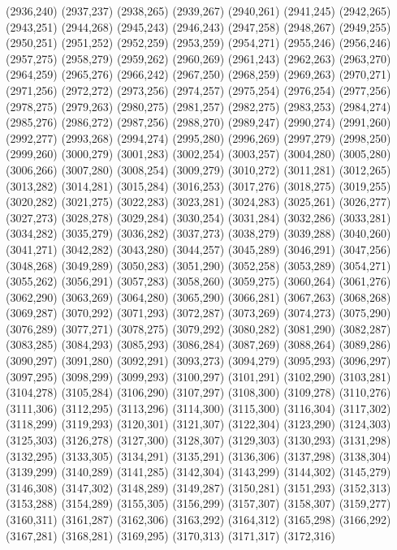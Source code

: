 (2936,240)
(2937,237)
(2938,265)
(2939,267)
(2940,261)
(2941,245)
(2942,265)
(2943,251)
(2944,268)
(2945,243)
(2946,243)
(2947,258)
(2948,267)
(2949,255)
(2950,251)
(2951,252)
(2952,259)
(2953,259)
(2954,271)
(2955,246)
(2956,246)
(2957,275)
(2958,279)
(2959,262)
(2960,269)
(2961,243)
(2962,263)
(2963,270)
(2964,259)
(2965,276)
(2966,242)
(2967,250)
(2968,259)
(2969,263)
(2970,271)
(2971,256)
(2972,272)
(2973,256)
(2974,257)
(2975,254)
(2976,254)
(2977,256)
(2978,275)
(2979,263)
(2980,275)
(2981,257)
(2982,275)
(2983,253)
(2984,274)
(2985,276)
(2986,272)
(2987,256)
(2988,270)
(2989,247)
(2990,274)
(2991,260)
(2992,277)
(2993,268)
(2994,274)
(2995,280)
(2996,269)
(2997,279)
(2998,250)
(2999,260)
(3000,279)
(3001,283)
(3002,254)
(3003,257)
(3004,280)
(3005,280)
(3006,266)
(3007,280)
(3008,254)
(3009,279)
(3010,272)
(3011,281)
(3012,265)
(3013,282)
(3014,281)
(3015,284)
(3016,253)
(3017,276)
(3018,275)
(3019,255)
(3020,282)
(3021,275)
(3022,283)
(3023,281)
(3024,283)
(3025,261)
(3026,277)
(3027,273)
(3028,278)
(3029,284)
(3030,254)
(3031,284)
(3032,286)
(3033,281)
(3034,282)
(3035,279)
(3036,282)
(3037,273)
(3038,279)
(3039,288)
(3040,260)
(3041,271)
(3042,282)
(3043,280)
(3044,257)
(3045,289)
(3046,291)
(3047,256)
(3048,268)
(3049,289)
(3050,283)
(3051,290)
(3052,258)
(3053,289)
(3054,271)
(3055,262)
(3056,291)
(3057,283)
(3058,260)
(3059,275)
(3060,264)
(3061,276)
(3062,290)
(3063,269)
(3064,280)
(3065,290)
(3066,281)
(3067,263)
(3068,268)
(3069,287)
(3070,292)
(3071,293)
(3072,287)
(3073,269)
(3074,273)
(3075,290)
(3076,289)
(3077,271)
(3078,275)
(3079,292)
(3080,282)
(3081,290)
(3082,287)
(3083,285)
(3084,293)
(3085,293)
(3086,284)
(3087,269)
(3088,264)
(3089,286)
(3090,297)
(3091,280)
(3092,291)
(3093,273)
(3094,279)
(3095,293)
(3096,297)
(3097,295)
(3098,299)
(3099,293)
(3100,297)
(3101,291)
(3102,290)
(3103,281)
(3104,278)
(3105,284)
(3106,290)
(3107,297)
(3108,300)
(3109,278)
(3110,276)
(3111,306)
(3112,295)
(3113,296)
(3114,300)
(3115,300)
(3116,304)
(3117,302)
(3118,299)
(3119,293)
(3120,301)
(3121,307)
(3122,304)
(3123,290)
(3124,303)
(3125,303)
(3126,278)
(3127,300)
(3128,307)
(3129,303)
(3130,293)
(3131,298)
(3132,295)
(3133,305)
(3134,291)
(3135,291)
(3136,306)
(3137,298)
(3138,304)
(3139,299)
(3140,289)
(3141,285)
(3142,304)
(3143,299)
(3144,302)
(3145,279)
(3146,308)
(3147,302)
(3148,289)
(3149,287)
(3150,281)
(3151,293)
(3152,313)
(3153,288)
(3154,289)
(3155,305)
(3156,299)
(3157,307)
(3158,307)
(3159,277)
(3160,311)
(3161,287)
(3162,306)
(3163,292)
(3164,312)
(3165,298)
(3166,292)
(3167,281)
(3168,281)
(3169,295)
(3170,313)
(3171,317)
(3172,316)
